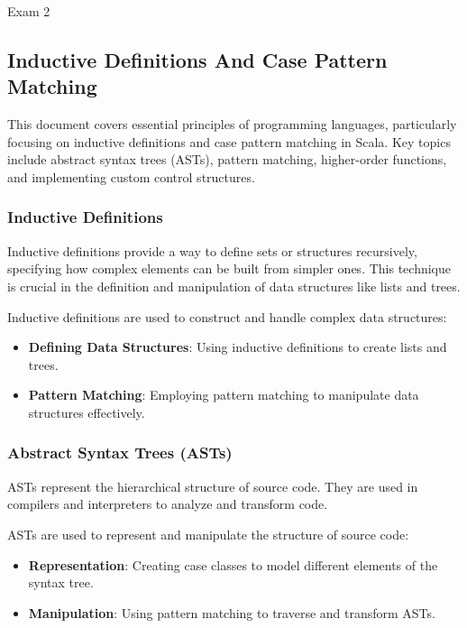 \begin{examnotes}{Exam 2}
    \subsection*{Inductive Definitions And Case Pattern Matching}

    This document covers essential principles of programming languages, particularly focusing on inductive definitions and case pattern matching in Scala. Key topics include abstract syntax trees 
    (ASTs), pattern matching, higher-order functions, and implementing custom control structures.
    
    \subsubsection*{Inductive Definitions}
    
    Inductive definitions provide a way to define sets or structures recursively, specifying how complex elements can be built from simpler ones. This technique is crucial in the definition and 
    manipulation of data structures like lists and trees.
    
    \begin{highlight}
        Inductive definitions are used to construct and handle complex data structures:
        \begin{itemize}
            \item \textbf{Defining Data Structures}: Using inductive definitions to create lists and trees.
            \item \textbf{Pattern Matching}: Employing pattern matching to manipulate data structures effectively.
        \end{itemize}
    \end{highlight}
    
    \subsubsection*{Abstract Syntax Trees (ASTs)}
    
    ASTs represent the hierarchical structure of source code. They are used in compilers and interpreters to analyze and transform code.
    
    \begin{highlight}
        ASTs are used to represent and manipulate the structure of source code:
        \begin{itemize}
            \item \textbf{Representation}: Creating case classes to model different elements of the syntax tree.
            \item \textbf{Manipulation}: Using pattern matching to traverse and transform ASTs.
        \end{itemize}
    \end{highlight}
    

\end{examnotes}
